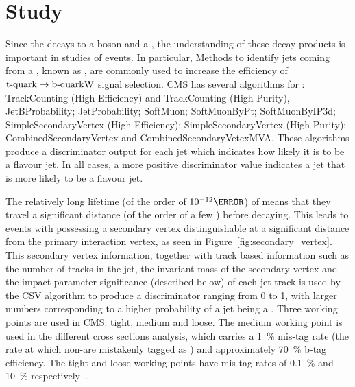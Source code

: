 \chapter{\btagging Study}
\label{c:b_tagging_study}

Since the \tquark decays to a \W boson and a \bquark, the understanding of these decay products is important
in studies of \ttbar events. In particular, Methods to identify jets coming from a \bquark, known as
\btagging, are commonly used to increase the efficiency of $\mathrm{t}\textrm{-quark}\rightarrow\mathrm{b}\textrm{-quark}\mathrm{W}$ signal selection. CMS
has several algorithms for \btagging: TrackCounting (High Efficiency) and TrackCounting (High Purity),
JetBProbability; JetProbability; SoftMuon; SoftMuonByPt; SoftMuonByIP3d; SimpleSecondaryVertex (High
Efficiency); SimpleSecondaryVertex (High Purity); CombinedSecondaryVertex and CombinedSecondaryVetexMVA. These
algorithms produce a discriminator output for each jet which indicates how likely it is to be a \bquark
flavour jet. In all cases, a more positive discriminator value indicates a jet that is more likely to be a
\bquark flavour jet.

The relatively long lifetime (of the order of $10^{-12}\s$) of \bquarks means that they travel a significant
distance (of the order of a few \mm) before decaying. This leads to events with \bjets possessing a secondary
vertex distinguishable at a significant distance from the primary interaction vertex, as seen in
Figure~\ref{fig:secondary_vertex}. This secondary vertex information, together with track based information
such as the number of tracks in the jet, the invariant mass of the secondary vertex and the impact parameter
significance (described below) of each jet track is used by the CSV algorithm to produce a discriminator
ranging from 0 to 1, with larger numbers corresponding to a higher probability of a jet being a \bjet. Three
\btagging working points are used in CMS: tight, medium and loose. The medium working point is used in the
different cross sections analysis, which carries a 1~\% mis-tag rate (the rate at which non-\bjets are
mistakenly tagged as \bjets) and approximately 70~\% b-tag efficiency.
The tight and loose working points have mis-tag rates of 0.1~\% and 10~\%
respectively~\cite{Chatrchyan:2012jua}.

